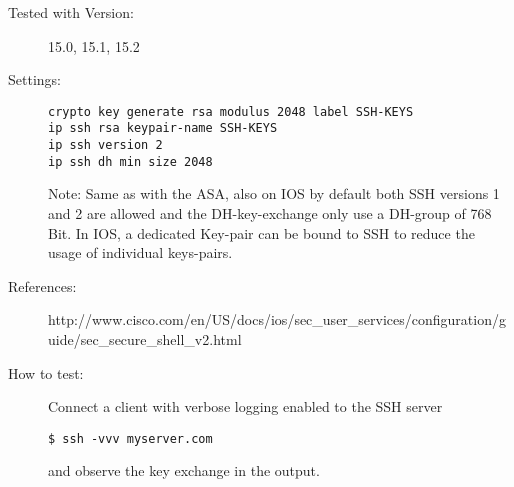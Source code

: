 \begin{description}
\item[Tested with Version:] 15.0, 15.1, 15.2

\item[Settings:] \mbox{}
\begin{lstlisting}[breaklines]
crypto key generate rsa modulus 2048 label SSH-KEYS
ip ssh rsa keypair-name SSH-KEYS
ip ssh version 2
ip ssh dh min size 2048
\end{lstlisting}
Note: Same as with the ASA, also on IOS by default both SSH versions 1 and 2 are allowed and the DH-key-exchange only use a DH-group of 768 Bit.
In IOS, a dedicated Key-pair can be bound to SSH to reduce the usage of individual keys-pairs.

\item[References:]
http://www.cisco.com/en/US/docs/ios/sec\_user\_services/configuration/guide/sec\_secure\_shell\_v2.html 


\item[How to test:]
Connect a client with verbose logging enabled to the SSH server \\
\begin{lstlisting}[breaklines]
$ ssh -vvv myserver.com
\end{lstlisting}and observe the key exchange in the output.
\end{description}
